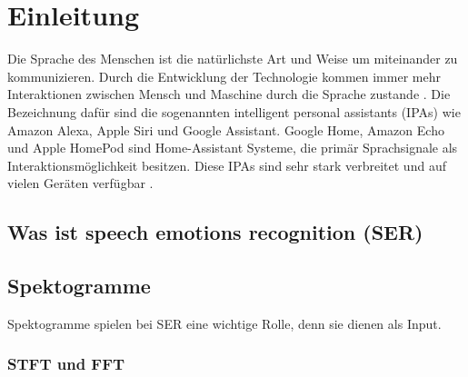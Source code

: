 \chapter{Einleitung}

Die Sprache des Menschen ist die natürlichste Art und Weise um miteinander zu kommunizieren. Durch die Entwicklung der Technologie kommen immer mehr Interaktionen zwischen Mensch und Maschine durch die Sprache zustande \cite{badshah2019deep}. Die Bezeichnung dafür sind die sogenannten intelligent personal assistants (IPAs) wie Amazon Alexa, Apple Siri und Google Assistant. Google Home, Amazon Echo und Apple HomePod sind Home-Assistant Systeme, die primär Sprachsignale als Interaktionsmöglichkeit besitzen. Diese IPAs sind sehr stark verbreitet und auf vielen Geräten verfügbar \cite{speech_in_hci}.


\section{Was ist speech emotions recognition (SER)}



\section{Spektogramme}
Spektogramme spielen bei SER eine wichtige Rolle, denn sie dienen als Input. 

\subsection{STFT und FFT}





